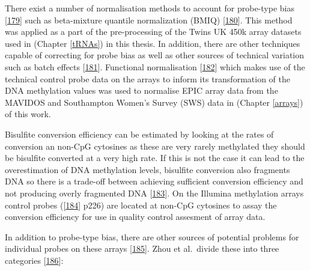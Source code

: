 \documentclass[
]{book}
\begin{document}
There exist a number of normalisation methods to account for probe-type bias {[}\protect\hyperlink{ref-Fortin2016}{179}{]} such as beta-mixture quantile normalization (BMIQ) {[}\protect\hyperlink{ref-Teschendorff2013}{180}{]}.
This method was applied as a part of the pre-processing of the Twins UK 450k array datasets used in (Chapter \ref{tRNAs}) in this thesis.
In addition, there are other techniques capable of correcting for probe bias as well as other sources of technical variation such as batch effects {[}\protect\hyperlink{ref-Leek2010}{181}{]}.
Functional normalisation {[}\protect\hyperlink{ref-Fortin2014}{182}{]} which makes use of the technical control probe data on the arrays to inform its transformation of the DNA methylation values was used to normalise EPIC array data from the MAVIDOS and Southampton Women's Survey (SWS) data in (Chapter \ref{arrays}) of this work.

Bisulfite conversion efficiency can be estimated by looking at the rates of conversion an non-CpG cytosines as these are very rarely methylated they should be bisulfite converted at a very high rate.
If this is not the case it can lead to the overestimation of DNA methylation levels, bisulfite conversion also fragments DNA so there is a trade-off between achieving sufficient conversion efficiency and not producing overly fragmented DNA {[}\protect\hyperlink{ref-Ehrich2007}{183}{]}.
On the Illumina methylation arrays control probes ({[}\protect\hyperlink{ref-Illumina2015}{184}{]} p226) are located at non-CpG cytosines to assay the conversion efficiency for use in quality control assesment of array data.

In addition to probe-type bias, there are other sources of potential problems for individual probes on these arrays {[}\protect\hyperlink{ref-Pidsley2016}{185}{]}.
Zhou et al.~divide these into three categories {[}\protect\hyperlink{ref-Zhou2017}{186}{]}:
\end{document}
